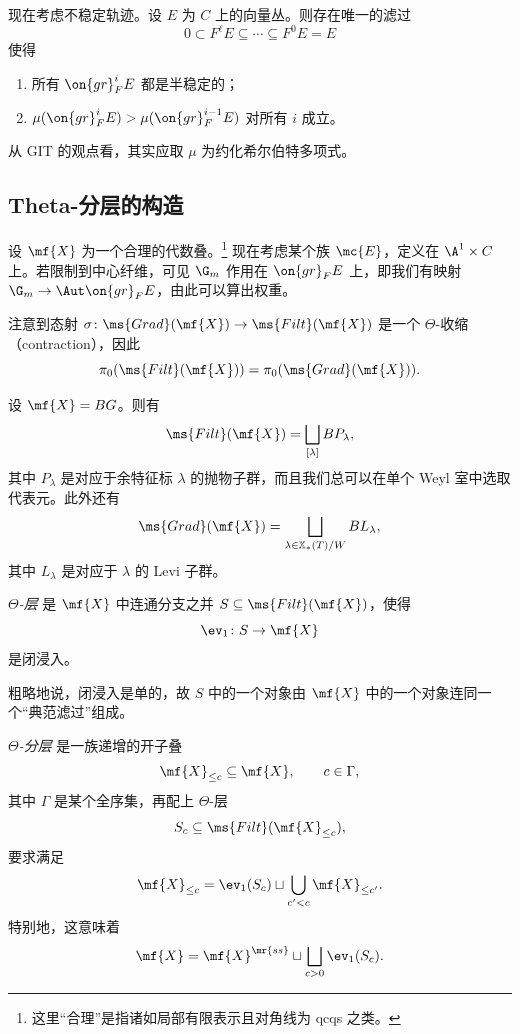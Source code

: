 现在考虑不稳定轨迹。设 \(E\) 为 \(C\) 上的向量丛。则存在唯一的滤过
\[ 0 \subset F^{\ell} E \subseteq \cdots \subseteq F^0 E = E \]
使得
\begin{enumerate}
    \item 所有 \(\on{gr}_F^i E\) 都是半稳定的；
    \item \(\mu(\on{gr}_F^i E) > \mu(\on{gr}_F^{i-1} E)\) 对所有 \(i\) 成立。 
\end{enumerate}
\begin{rmk}
    从 GIT 的观点看，其实应取 \(\mu\) 为约化希尔伯特多项式。
\end{rmk}

\subsection{Theta-分层的构造}%
\label{sub:Construction of Theta-stratifications}

设 \(\mf{X}\) 为一个合理的代数叠。\footnote{这里“合理”是指诸如局部有限表示且对角线为 qcqs 之类。} 现在考虑某个族 \(\mc{E}\)，定义在 \(\A^1 \times C\) 上。若限制到中心纤维，可见 \(\G_m\) 作用在 \(\on{gr}_F E\) 上，即我们有映射 \(\G_m \to \Aut \on{gr}_F E\)，由此可以算出权重。

注意到态射 \(\sigma \colon \ms{Grad}(\mf{X}) \to \ms{Filt}(\mf{X})\) 是一个 \(\Theta\)-收缩（contraction），因此
\[ \pi_0(\ms{Filt}(\mf{X})) = \pi_0(\ms{Grad}(\mf{X})). \]

\begin{exm}
    设 \(\mf{X} = BG\)。则有
    \[\ms{Filt}(\mf{X}) = \bigsqcup_{[\lambda]} B P_{\lambda}, \]
    其中 \(P_{\lambda}\) 是对应于余特征标 \(\lambda\) 的抛物子群，而且我们总可以在单个 Weyl 室中选取代表元。此外还有
    \[ \ms{Grad}(\mf{X}) = \bigsqcup_{\lambda \in \mathbb{X}_*(T)/W} B L_{\lambda}, \]
    其中 \(L_{\lambda}\) 是对应于 \(\lambda\) 的 Levi 子群。
\end{exm}

\begin{defn}
    \textit{\(\Theta\)-层} 是 \(\mf{X}\) 中连通分支之并 \(S \subseteq \ms{Filt}(\mf{X})\)，使得
    \[ \ev_1 \colon S \to \mf{X} \]
    是闭浸入。
\end{defn}

粗略地说，闭浸入是单的，故 \(S\) 中的一个对象由 \(\mf{X}\) 中的一个对象连同一个“典范滤过”组成。

\begin{defn}
    \textit{\(\Theta\)-分层} 是一族递增的开子叠
    \[ \mf{X}_{\leq c} \subseteq \mf{X}, \qquad c \in \Gamma, \]
    其中 \(\Gamma\) 是某个全序集，再配上 \(\Theta\)-层
    \[ S_c \subseteq \ms{Filt}(\mf{X}_{\leq c}), \]
    要求满足
    \[ \mf{X}_{\leq c} = \ev_1(S_c) \sqcup \bigcup_{c' < c} \mf{X}_{\leq c'}. \]
    特别地，这意味着
    \[ \mf{X} = \mf{X}^{\mr{ss}} \sqcup \bigsqcup_{c > 0} \ev_1(S_c). \]
\end{defn}

